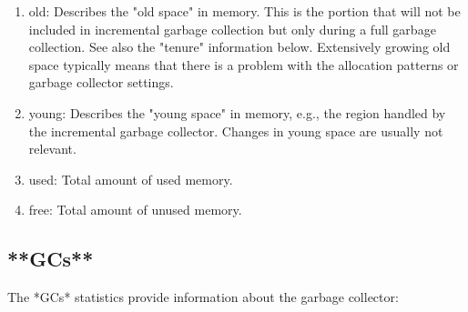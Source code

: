 \documentclass[a4paper,10pt,twoside]{book}
\begin{document}
\begin{enumerate}
\item old: Describes the "old space" in memory. This is the portion that
will not be included in incremental garbage collection but only during a
full garbage collection. See also the "tenure" information below.
Extensively growing old space typically means that there is a problem
with the allocation patterns or garbage collector settings.

\item young: Describes the "young space" in memory, e.g., the region handled
by the incremental garbage collector. Changes in young space are usually
not relevant.

\item used: Total amount of used memory.

\item free: Total amount of unused memory.
\end{enumerate}

\subsection{**GCs**}

The *GCs* statistics provide information about the garbage collector:
\end{document}
